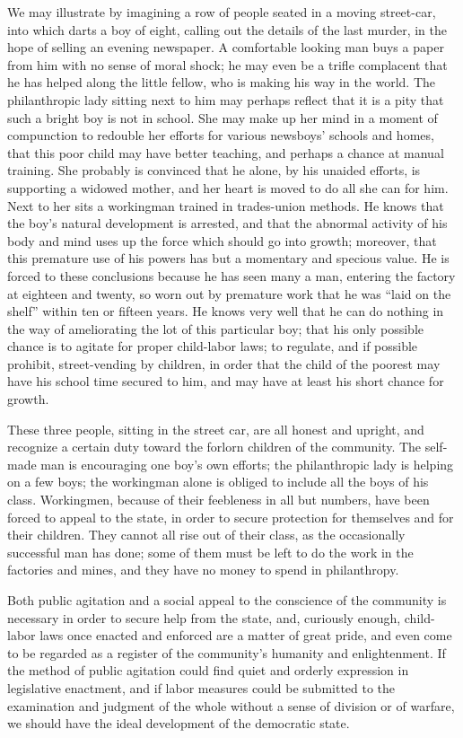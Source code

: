 \documentclass[]{article}
\begin{document}
\begin{sectionbody}
\addamsparagraph We may illustrate by imagining a row of people seated in a moving
street-car, into which darts a boy of eight, calling out the details of
the last murder, in the hope of selling an evening newspaper. A
comfortable looking man buys a paper from him with no sense of moral
shock; he may even be a trifle complacent that he has helped along the
little fellow, who is making his way in the world. The philanthropic
lady sitting next to him may perhaps reflect that it is a pity that such
a bright boy is not in school. She may make up her mind in a moment of
compunction to redouble her efforts for various newsboys' schools and
homes, that this poor child may have better teaching, and perhaps a
chance at manual training. She probably is convinced that he alone, by
his unaided efforts, is supporting a widowed mother, and her heart is
moved to do all she can for him. Next to her sits a workingman trained
in trades-union methods. He knows that the boy's natural development is
arrested, and that the abnormal activity of his body and mind uses up
the force which should go into growth; moreover, that this premature use
of his powers has but a momentary and specious value. He is forced to
these conclusions because he has seen many a man, entering the factory
at eighteen and twenty, so worn out by premature work that he was ``laid
on the shelf'' within ten or fifteen years. He knows very well that he
can do nothing in the way of ameliorating the lot of this particular
boy; that his only possible chance is to agitate for proper child-labor
laws; to regulate, and if possible prohibit, street-vending by children,
in order that the child of the poorest may have his school time secured
to him, and may have at least his short chance for growth.

\addamsparagraph These three people, sitting in the street car, are all honest and
upright, and recognize a certain duty toward the forlorn children of the
community. The self-made man is encouraging one boy's own efforts; the
philanthropic lady is helping on a few boys; the workingman alone is
obliged to include all the boys of his class. Workingmen, because of
their feebleness in all but numbers, have been forced to appeal to the
state, in order to secure protection for themselves and for their
children. They cannot all rise out of their class, as the occasionally
successful man has done; some of them must be left to do the work in the
factories and mines, and they have no money to spend in philanthropy.

\addamsparagraph Both public agitation and a social appeal to the conscience of the
community is necessary in order to secure help from the state, and,
curiously enough, child-labor laws once enacted and enforced are a
matter of great pride, and even come to be regarded as a register of the
community's humanity and enlightenment. If the method of public
agitation could find quiet and orderly expression in legislative
enactment, and if labor measures could be submitted to the examination
and judgment of the whole without a sense of division or of warfare, we
should have the ideal development of the democratic state.


\end{sectionbody}
\end{document}
